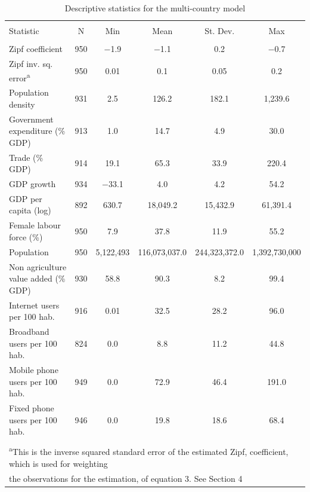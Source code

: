 \documentclass[10pt,letterpaper]{article}
\begin{document}
\begin{table}[!htbp] \centering 
  \caption{Descriptive statistics for the multi-country model\label{desc.global}} 
  \label{} 
\footnotesize 
\begin{tabular}{@{\extracolsep{1pt}}lccccc} 
\\[-1.8ex]\hline 
\hline \\[-1.8ex] 
Statistic & \multicolumn{1}{c}{N} & \multicolumn{1}{c}{Min} & \multicolumn{1}{c}{Mean} & \multicolumn{1}{c}{St. Dev.} & \multicolumn{1}{c}{Max} \\ 
\hline \\[-1.8ex] 
Zipf coefficient & 950 & $-$1.9 & $-$1.1 & 0.2 & $-$0.7 \\ 
Zipf inv. sq. error\textsuperscript{a} & 950 & 0.01 & 0.1 & 0.05 & 0.2 \\ 
Population density & 931 & 2.5 & 126.2 & 182.1 & 1,239.6 \\ 
Government expenditure (\% GDP) & 913 & 1.0 & 14.7 & 4.9 & 30.0 \\ 
Trade (\% GDP) & 914 & 19.1 & 65.3 & 33.9 & 220.4 \\ 
GDP growth & 934 & $-$33.1 & 4.0 & 4.2 & 54.2 \\ 
GDP per capita (log) & 892 & 630.7 & 18,049.2 & 15,432.9 & 61,391.4 \\ 
Female labour force (\%) & 950 & 7.9 & 37.8 & 11.9 & 55.2 \\ 
Population & 950 & 5,122,493 & 116,073,037.0 & 244,323,372.0 & 1,392,730,000 \\ 
Non agriculture value added (\% GDP) & 930 & 58.8 & 90.3 & 8.2 & 99.4 \\ 
Internet users per 100 hab. & 916 & 0.01 & 32.5 & 28.2 & 96.0 \\ 
Broadband users per 100 hab. & 824 & 0.0 & 8.8 & 11.2 & 44.8 \\ 
Mobile phone users per 100 hab. & 949 & 0.0 & 72.9 & 46.4 & 191.0 \\ 
Fixed phone users per 100 hab. & 946 & 0.0 & 19.8 & 18.6 & 68.4 \\ 
\hline \\[-1.8ex] 
\multicolumn{6}{l}{\textsuperscript{a}This is the inverse squared standard error of the estimated Zipf, coefficient, which is used for weighting} \\ 
\multicolumn{6}{l}{the observations for the estimation, of equation 3. See Section 4} \\ 
\end{tabular} 
\end{table}
\end{document}
